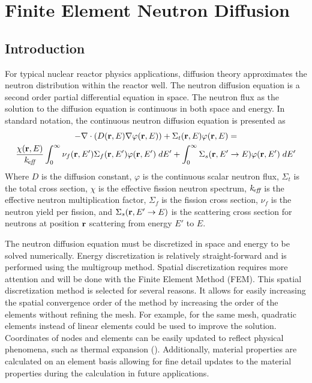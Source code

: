 \chapter{Finite Element Neutron Diffusion}
\label{ch:neutronDiffusion}

\section{Introduction}
  For typical nuclear reactor physics applications, diffusion theory
  approximates the neutron distribution within the reactor well. The neutron 
  diffusion equation is a second order partial differential equation in space.
  The neutron flux as the solution to the diffusion equation is continuous in
  both space and energy. In standard notation, the continuous neutron diffusion
  equation is presented as
  \begin{multline}\label{eq:continuous_diffusion}
    -\mathbf{\nabla} \cdot (D(\mathbf{r},E) \mathbf{\nabla} \varphi(\mathbf{r},E)) + \Sigma_t(\mathbf{r},E) 
      \varphi(\mathbf{r},E) = \\
      \frac{\chi(\mathbf{r},E)}{k_{\!\mbox{\scriptsize \em eff}}} \int_0^{\infty} \nu_f(\mathbf{r},E') \Sigma_f(\mathbf{r},E') 
      \varphi(\mathbf{r},E') \; dE' + \int_0^{\infty} \Sigma_s(\mathbf{r},E' \rightarrow E) 
      \varphi(\mathbf{r},E') \; dE'
  \end{multline}
  Where $D$ is the diffusion constant, $\varphi$ is the continuous scalar 
  neutron flux, $\Sigma_t$ is the total cross section, $\chi$ is the effective 
  fission neutron spectrum, $k_{\!\mbox{\scriptsize \em eff}}$ is the effective neutron multiplication 
  factor, $\Sigma_f$ is the fission cross section, $\nu_f$ is the neutron yield 
  per fission, and $\Sigma_s(\mathbf{r},E' \rightarrow E)$ is the scattering cross 
  section for neutrons at position $\mathbf{r}$ scattering from energy $E'$ to $E$.
  
  The neutron diffusion equation must be discretized in space and 
  energy to be solved numerically. Energy discretization is relatively 
  straight-forward and is performed using the multigroup method. Spatial 
  discretization requires more attention and will be done with the Finite 
  Element Method (FEM). This spatial discretization method is selected for 
  several reasons. It allows for easily increasing the spatial convergence order
  of the method by increasing the order of the elements without refining the
  mesh. For example, for the same mesh, quadratic elements instead of linear
  elements could be used to improve the solution. Coordinates of nodes and 
  elements can be easily updated to reflect physical phenomena, such as thermal 
  expansion (). Additionally, material properties are 
  calculated on an element basis allowing for fine detail updates to the 
  material properties during the calculation in future applications.
  
